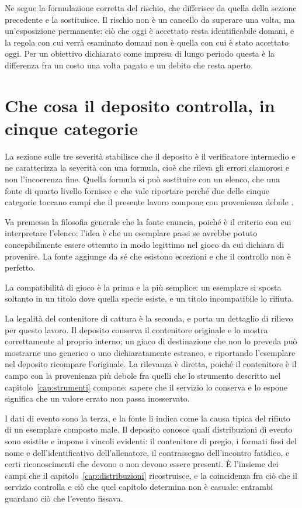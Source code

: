 Ne segue la formulazione corretta del rischio, che differisce da quella della sezione precedente e la sostituisce. Il rischio non è un cancello da superare una volta, ma un'esposizione permanente: ciò che oggi è accettato resta identificabile domani, e la regola con cui verrà esaminato domani non è quella con cui è stato accettato oggi. Per un obiettivo dichiarato come impresa di lungo periodo questa è la differenza fra un costo una volta pagato e un debito che resta aperto.

\section{Che cosa il deposito controlla, in cinque categorie}

La sezione sulle tre severità stabilisce che il deposito è il verificatore intermedio e ne caratterizza la severità con una formula, cioè che rileva gli errori clamorosi e non l'incoerenza fine. Quella formula si può sostituire con un elenco, che una fonte di quarto livello fornisce e che vale riportare perché due delle cinque categorie toccano campi che il presente lavoro compone con provenienza debole \cite{amiibodoctor-generazione}.

Va premessa la filosofia generale che la fonte enuncia, poiché è il criterio con cui interpretare l'elenco: l'idea è che un esemplare passi se avrebbe potuto concepibilmente essere ottenuto in modo legittimo nel gioco da cui dichiara di provenire. La fonte aggiunge da sé che esistono eccezioni e che il controllo non è perfetto.

La compatibilità di gioco è la prima e la più semplice: un esemplare si sposta soltanto in un titolo dove quella specie esiste, e un titolo incompatibile lo rifiuta.

La legalità del contenitore di cattura è la seconda, e porta un dettaglio di rilievo per questo lavoro. Il deposito conserva il contenitore originale e lo mostra correttamente al proprio interno; un gioco di destinazione che non lo preveda può mostrarne uno generico o uno dichiaratamente estraneo, e riportando l'esemplare nel deposito ricompare l'originale. La rilevanza è diretta, poiché il contenitore è il campo con la provenienza più debole fra quelli che lo strumento descritto nel capitolo~\ref{cap:strumenti} compone: sapere che il servizio lo conserva e lo espone significa che un valore errato non passa inosservato.

I dati di evento sono la terza, e la fonte li indica come la causa tipica del rifiuto di un esemplare composto male. Il deposito conosce quali distribuzioni di evento sono esistite e impone i vincoli evidenti: il contenitore di pregio, i formati fissi del nome e dell'identificativo dell'allenatore, il contrassegno dell'incontro fatidico, e certi riconoscimenti che devono o non devono essere presenti. È l'insieme dei campi che il capitolo~\ref{cap:distribuzioni} ricostruisce, e la coincidenza fra ciò che il servizio controlla e ciò che quel capitolo determina non è casuale: entrambi guardano ciò che l'evento fissava.

